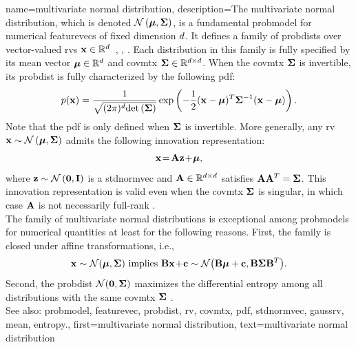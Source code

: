 {name={multivariate normal distribution}, 
	description={The multivariate normal distribution, 
 		which is denoted $\mathcal{N}\left({\bm \mu},{\bf \Sigma}\right)$, is a fundamental \gls{probmodel} 
 		for numerical \glspl{featurevec} of fixed dimension $d$. 
 		It defines a family of \glspl{probdist} over vector-valued \glspl{rv} 
 		${\bf x} \in \mathbb{R}^{d}$~\cite{BertsekasProb}, \cite{GrayProbBook}, \cite{Lapidoth09}. 
 		Each distribution in this family is fully specified by its \gls{mean} vector 
 		${\bm \mu} \in \mathbb{R}^{d}$ and \gls{covmtx} ${\bf \Sigma} \in \mathbb{R}^{d \times d}$. 
 		When the \gls{covmtx} ${\bf \Sigma}$ is invertible, its \gls{probdist} is 
 		fully characterized by the following \gls{pdf}:
 		\[
 		p({\bf x}) = 
 		\frac{1}{\sqrt{(2\pi)^{d} {\rm det}\left( {\bf \Sigma} \right)}} 
 		\exp\left( -\frac{1}{2} 
 		({\bf x} - {\bm \mu})^T {\bf \Sigma}^{-1} 
 		({\bf x} - {\bm \mu}) \right).
 		\]
 		Note that the \gls{pdf} is only defined when ${\bf \Sigma}$ is invertible.
     		More generally, any \gls{rv} ${\bf x} \sim \mathcal{N}\left({\bm \mu},{\bf \Sigma}\right)$ 
     		admits the following innovation representation:
		\[{\bf x} \!=\! {\bf A} {\bf z} \!+\!{\bm \mu},
		\]
		where ${\bf z} \sim \mathcal{N}\left(\mathbf{0},\mathbf{I}\right)$ is a \gls{stdnormvec} 
		and ${\bf A} \in \mathbb{R}^{d \times d}$ satisfies ${\bf A} {\bf A}^T = {\bf \Sigma}$. 
		This innovation representation is valid even when the \gls{covmtx} ${\bf \Sigma}$ is singular, 
		in which case ${\bf A}$ is not necessarily full-rank \cite[Ch. 23]{Lapidoth2017}.\\ 
		The family of multivariate normal distributions is exceptional among \glspl{probmodel} for numerical 
		quantities at least for the following reasons. First, the family is closed under affine transformations, i.e., 
		\[ 
		{\bf x} \sim \mathcal{N}({\bm \mu},{\bf \Sigma}) \mbox{ implies } 
		{\bf B}{\bf x}\!+\!{\bf c} \sim \mathcal{N}\big( {\bf B}{\bm \mu}+{\bf c},{\bf B} {\bf \Sigma} {\bf B}^{T} \big). 
		\]
		Second, the \gls{probdist} $\mathcal{N}(\mathbf{0},{\bf \Sigma})$ maximizes the differential \gls{entropy} 
		among all distributions with the same \gls{covmtx} ${\bf \Sigma}$ \cite{coverthomas}. 
		\\ 
		See also: \gls{probmodel}, \gls{featurevec}, \gls{probdist}, \gls{rv}, \gls{covmtx}, \gls{pdf}, \gls{stdnormvec}, \gls{gaussrv}, \gls{mean}, \gls{entropy}.}, 
		first={multivariate normal distribution},
		text={multivariate normal distribution}
}

